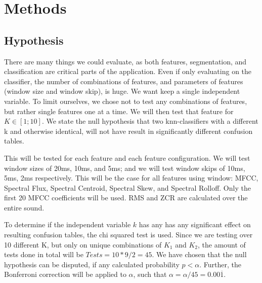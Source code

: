 
\section{Methods}
	\subsection{Hypothesis}
		There are many things we could evaluate, as both features, segmentation, and classification are critical parts of the application. Even if only evaluating on the classifier, the number of combinations of features, and parameters of features (window size and window skip), is huge. We want keep a single independent variable. To limit ourselves, we chose not to test any combinations of features, but rather single features one at a time. We will then test that feature for $K \in [1;10]$. We state the null hypothesis that two knn-classifiers with a different k and otherwise identical, will not have result in significantly different confusion tables.
		
		This will be tested for each feature and each feature configuration.
		We will test window sizes of 20ms, 10ms, and 5ms; and we will test window skips of 10ms, 5ms, 2ms respectively. This will be the case for all features using window: MFCC, Spectral Flux, Spectral Centroid, Spectral Skew, and Spectral Rolloff. Only the first 20 MFCC coefficients will be used. RMS and ZCR are calculated over the entire sound.
		
		To determine if the independent variable $k$ has any has any significant effect on resulting confusion tables, the chi squared test is used. Since we are testing over 10 different K, but only on unique combinations of $K_1$ and $K_2$, the amount of tests done in total will be $Tests = 10*9/2 = 45$. We have chosen that the null hypothesis can be disputed, if any calculated probability $p < \alpha$. Further, the Bonferroni correction\citep{bonferroni} will be applied to $\alpha$, such that $\alpha=\alpha/45 = 0.00\overline{1}$.
		
